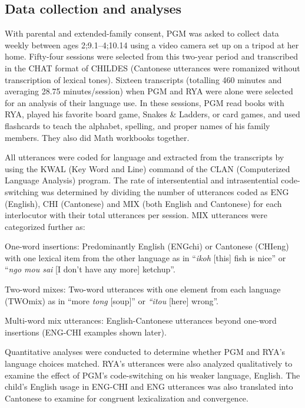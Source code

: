\documentclass[output=paper,colorlinks,citecolor=brown]{langscibook}
\begin{document}
\subsection{Data collection and analyses}\label{sec:quay:3.2}

With parental and extended-family consent, PGM was asked to collect data weekly between ages 2;9.1–4;10.14 using a video camera set up on a tripod at her home. Fifty-four sessions were selected from this two-year period and transcribed in the CHAT format of CHILDES (Cantonese utterances were romanized without transcription of lexical tones). Sixteen transcripts (totalling 460 minutes and averaging 28.75 minutes/session) when PGM and RYA were alone were selected for an analysis of their language use. In these sessions, PGM read books with RYA, played his favorite board game, Snakes \& Ladders, or card games, and used flashcards to teach the alphabet, spelling, and proper names of his family members. They also did Math workbooks together.

All utterances were coded for language and extracted from the transcripts by using the KWAL (Key Word and Line) command of the CLAN (Computerized Language Analysis) program. The rate of intersentential and intrasentential code-switching was determined by dividing the number of utterances coded as ENG (English), CHI (Cantonese) and MIX (both English and Cantonese) for each interlocutor with their total utterances per session. MIX utterances were categorized further as: 

\setcounter{equation}{0}
\ea
One-word insertions: Predominantly English (ENGchi) or Cantonese (CHIeng) with one lexical item from the other language as in “\textit{ikoh} [this] fish is nice” or “\textit{ngo mou sai} [I don’t have any more] ketchup”.
\z


\ea
Two-word mixes: Two-word utterances with one element from each language (TWOmix) as in “more \textit{tong} [soup]” or \textit{“itou} [here] wrong”.
\z


\ea
Multi-word mix utterances: English-Cantonese utterances beyond one-word insertions (ENG-CHI examples shown later).
\z



Quantitative analyses were conducted to determine whether PGM and RYA’s language choices matched. RYA’s utterances were also analyzed qualitatively to examine the effect of PGM’s code-switching on his weaker language, English. The child’s English usage in ENG-CHI and ENG utterances was also translated into Cantonese to examine for congruent lexicalization and convergence. 
\end{document}
